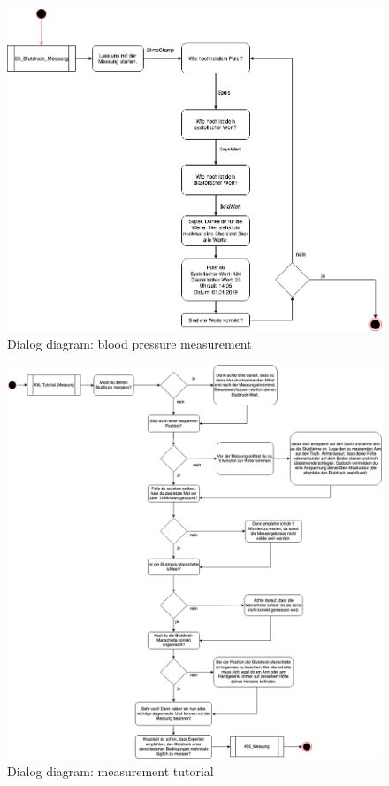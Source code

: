 \begin{figure}[h!]
	\centering
	\includegraphics[width=1\textwidth]{images/03_blutdruck_messung.png}
	\caption{Dialog diagram: blood pressure measurement}
	\label{dialog_diagram_03}
\end{figure}

\begin{figure}[h!]
	\centering
	\includegraphics[width=1\textwidth]{images/06_tutorial_messung.png}
	\caption{Dialog diagram: measurement tutorial}
	\label{dialog_diagram_04}
\end{figure}

